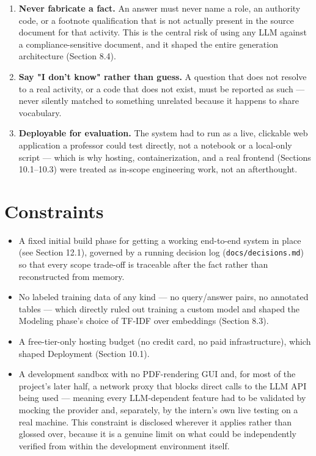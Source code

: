 \begin{enumerate}
\item \textbf{Never fabricate a fact.} An answer must never name a role, an authority code, or a footnote qualification that is not actually present in the source document for that activity. This is the central risk of using any LLM against a compliance-sensitive document, and it shaped the entire generation architecture (Section 8.4).
\item \textbf{Say "I don't know" rather than guess.} A question that does not resolve to a real activity, or a code that does not exist, must be reported as such — never silently matched to something unrelated because it happens to share vocabulary.
\item \textbf{Deployable for evaluation.} The system had to run as a live, clickable web application a professor could test directly, not a notebook or a local-only script — which is why hosting, containerization, and a real frontend (Sections 10.1–10.3) were treated as in-scope engineering work, not an afterthought.
\end{enumerate}
\section{Constraints}
\begin{itemize}
\item A fixed initial build phase for getting a working end-to-end system in place (see Section 12.1), governed by a running decision log (\texttt{docs/\allowbreak{}decisions.md}) so that every scope trade-off is traceable after the fact rather than reconstructed from memory.
\item No labeled training data of any kind — no query/answer pairs, no annotated tables — which directly ruled out training a custom model and shaped the Modeling phase's choice of TF-IDF over embeddings (Section 8.3).
\item A free-tier-only hosting budget (no credit card, no paid infrastructure), which shaped Deployment (Section 10.1).
\item A development sandbox with no PDF-rendering GUI and, for most of the project's later half, a network proxy that blocks direct calls to the LLM API being used — meaning every LLM-dependent feature had to be validated by mocking the provider and, separately, by the intern's own live testing on a real machine. This constraint is disclosed wherever it applies rather than glossed over, because it is a genuine limit on what could be independently verified from within the development environment itself.
\end{itemize}
